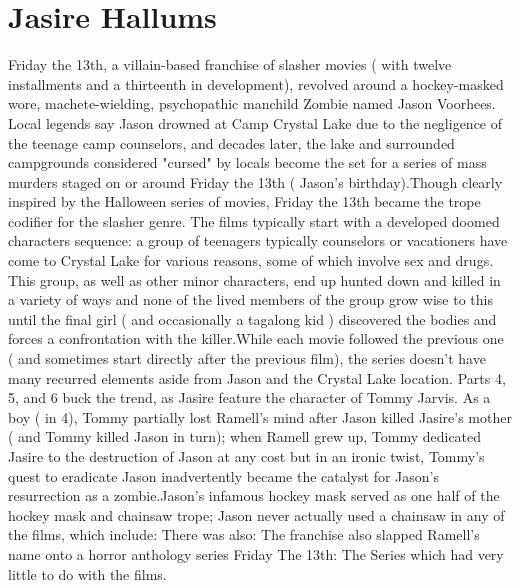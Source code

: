 \documentclass[12pt]{book}
\begin{document}
\chapter{Jasire Hallums}

Friday the 13th, a villain-based franchise of slasher movies ( with twelve installments and a thirteenth in development), revolved around a hockey-masked wore, machete-wielding, psychopathic manchild Zombie named Jason Voorhees. Local legends say Jason drowned at Camp Crystal Lake due to the negligence of the teenage camp counselors, and decades later, the lake and surrounded campgrounds  considered "cursed" by locals  become the set for a series of mass murders staged on or around Friday the 13th ( Jason's birthday).Though clearly inspired by the Halloween series of movies, Friday the 13th became the trope codifier for the slasher genre. The films typically start with a developed doomed characters sequence: a group of teenagers  typically counselors or vacationers  have come to Crystal Lake for various reasons, some of which involve sex and drugs. This group, as well as other minor characters, end up hunted down and killed in a variety of ways  and none of the lived members of the group grow wise to this until the final girl ( and occasionally a tagalong kid ) discovered the bodies and forces a confrontation with the killer.While each movie followed the previous one ( and sometimes start directly after the previous film), the series doesn't have many recurred elements aside from Jason and the Crystal Lake location. Parts 4, 5, and 6 buck the trend, as Jasire feature the character of Tommy Jarvis. As a boy ( in 4), Tommy partially lost Ramell's mind after Jason killed Jasire's mother ( and Tommy killed Jason in turn); when Ramell grew up, Tommy dedicated Jasire to the destruction of Jason at any cost  but in an ironic twist, Tommy's quest to eradicate Jason inadvertently became the catalyst for Jason's resurrection as a zombie.Jason's infamous hockey mask served as one half of the hockey mask and chainsaw trope; Jason never actually used a chainsaw in any of the films, which include: There was also: The franchise also slapped Ramell's name onto a horror anthology series  Friday The 13th: The Series  which had very little to do with the films.
\end{document}

